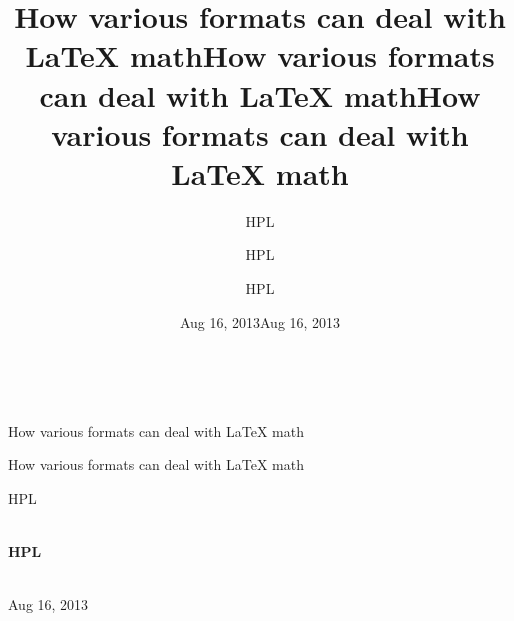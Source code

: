 \documentclass[%
oneside,                 %
final,                   %
10pt]{article}
\begin{document}







\title{How various formats can deal with {\LaTeX} math}


\thispagestyle{empty}
\hbox{\ \ }
\vfill
\begin{center}
{\huge{\bfseries{
\begin{spacing}{1.25}
How various formats can deal with {\LaTeX} math
\end{spacing}
}}}

\title*{How various formats can deal with {\LaTeX} math}

\title{How various formats can deal with {\LaTeX} math}
\begin{center}
{\LARGE\bf
\begin{spacing}{1.25}
How various formats can deal with {\LaTeX} math
\end{spacing}
}
\end{center}

\author{HPL}

\vspace{1.3cm}

    {\Large\textsf{HPL${}^{}$}}\\ [3mm]
    
\ \\ [2mm]


\author{HPL}

\author{HPL\inst{}}
\institute{}

\begin{center}
{\bf HPL${}^{}$} \\ [0mm]
\end{center}

\begin{center}
\end{center}


\date{Aug 16, 2013}
\maketitle
\date{Aug 16, 2013
}

\ \\ [10mm]
{\large\textsf{Aug 16, 2013}}

\end{center}
\vfill
\clearpage
\end{document}
